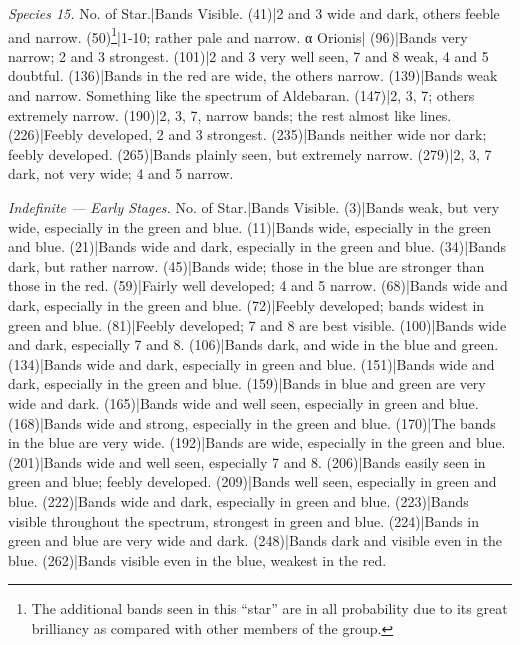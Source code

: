 \documentclass[a4paper, 12pt, oneside, polutonikogreek, english]{article}
\begin{document}
\emph{Species 15.} 
No. of Star.|Bands Visible. 
(41)|2 and 3 wide and dark, others feeble and narrow. 
(50)\footnote{The additional bands seen in this ``star'' are in all probability due to its great brilliancy as compared with other members of the group.}|1-10; rather pale and narrow. 
α Orionis| 
(96)|Bands very narrow; 2 and 3 strongest. 
(101)|2 and 3 very well seen, 7 and 8 weak, 4 and 5 doubtful. 
(136)|Bands in the red are wide, the others narrow. 
(139)|Bands weak and narrow. Something like the spectrum of Aldebaran. 
(147)|2, 3, 7; others extremely narrow. 
(190)|2, 3, 7, narrow bands; the rest almost like lines. 
(226)|Feebly developed, 2 and 3 strongest. 
(235)|Bands neither wide nor dark; feebly developed. 
(265)|Bands plainly seen, but extremely narrow. 
(279)|2, 3, 7 dark, not very wide; 4 and 5 narrow. 

\emph{Indefinite --- Early Stages.} 
No. of Star.|Bands Visible. 
(3)|Bands weak, but very wide, especially in the green and blue. 
(11)|Bands wide, especially in the green and blue. 
(21)|Bands wide and dark, especially in the green and blue. 
(34)|Bands dark, but rather narrow. 
(45)|Bands wide; those in the blue are stronger than those in the red. 
(59)|Fairly well developed; 4 and 5 narrow. 
(68)|Bands wide and dark, especially in the green and blue. 
(72)|Feebly developed; bands widest in green and blue. 
(81)|Feebly developed; 7 and 8 are best visible. 
(100)|Bands wide and dark, especially 7 and 8. 
(106)|Bands dark, and wide in the blue and green.  
(134)|Bands wide and dark, especially in green and blue. 
(151)|Bands wide and dark, especially in the green and blue. 
(159)|Bands in blue and green are very wide and dark. 
(165)|Bands wide and well seen, especially in green and blue. 
(168)|Bands wide and strong, especially in the green and blue. 
(170)|The bands in the blue are very wide. 
(192)|Bands are wide, especially in the green and blue. 
(201)|Bands wide and well seen, especially 7 and 8. 
(206)|Bands easily seen in green and blue; feebly developed. 
(209)|Bands well seen, especially in green and blue. 
(222)|Bands wide and dark, especially in green and blue. 
(223)|Bands visible throughout the spectrum, strongest in green and blue. 
(224)|Bands in green and blue are very wide and dark. 
(248)|Bands dark and visible even in the blue. 
(262)|Bands visible even in the blue, weakest in the red. 
\end{document}
